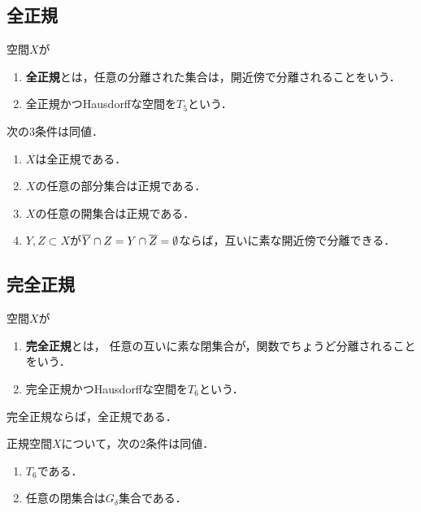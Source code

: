 \documentclass[uplatex,dvipdfmx]{jsreport}
\begin{document}
\subsection{全正規}

\begin{definition}
    空間$X$が
    \begin{enumerate}
        \item \textbf{全正規}とは，任意の分離された集合は，開近傍で分離されることをいう．
        \item 全正規かつHausdorffな空間を$T_5$という．
    \end{enumerate}
\end{definition}

\begin{proposition}
    次の3条件は同値．
    \begin{enumerate}
        \item $X$は全正規である．
        \item $X$の任意の部分集合は正規である．
        \item $X$の任意の開集合は正規である．
        \item $Y,Z\subset X$が$\overline{Y}\cap Z=Y\cap\overline{Z}=\emptyset$ならば，互いに素な開近傍で分離できる．
    \end{enumerate}
\end{proposition}

\subsection{完全正規}

\begin{definition}
    空間$X$が
    \begin{enumerate}
        \item \textbf{完全正規}とは，
        任意の互いに素な閉集合が，関数でちょうど分離されることをいう．
        \item 完全正規かつHausdorffな空間を$T_6$という．
    \end{enumerate}
\end{definition}

\begin{proposition}
    完全正規ならば，全正規である．
\end{proposition}

\begin{proposition}
    正規空間$X$について，次の2条件は同値．
    \begin{enumerate}
        \item $T_6$である．
        \item 任意の閉集合は$G_\delta$集合である．
    \end{enumerate}
\end{proposition}
\end{document}
